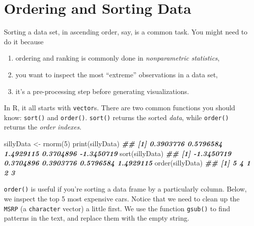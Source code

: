 \documentclass[
  12pt,
  krantz2]{krantz}
\makeatletter
\newenvironment{Shaded}{\begin{snugshade}}{\end{snugshade}}
\newcommand{\DecValTok}[1]{\textcolor[rgb]{0.06,0.06,0.06}{#1}}
\newcommand{\DocumentationTok}[1]{\textcolor[rgb]{0.37,0.37,0.37}{\textbf{\textit{#1}}}}
\newcommand{\FunctionTok}[1]{\textcolor[rgb]{0,0,0}{#1}}
\newcommand{\NormalTok}[1]{#1}
\newcommand{\OtherTok}[1]{\textcolor[rgb]{0.37,0.37,0.37}{#1}}
\providecommand{\tightlist}{%
  \setlength{\itemsep}{0pt}\setlength{\parskip}{0pt}}
\newenvironment{kframe}{%
\medskip{}
\setlength{\fboxsep}{.8em}
 \def\at@end@of@kframe{}%
 \ifinner\ifhmode%
  \def\at@end@of@kframe{\end{minipage}}%
  \begin{minipage}{\columnwidth}%
 \fi\fi%
 \def\FrameCommand##1{\hskip\@totalleftmargin \hskip-\fboxsep
 \colorbox{shadecolor}{##1}\hskip-\fboxsep
     \hskip-\linewidth \hskip-\@totalleftmargin \hskip\columnwidth}%
 \MakeFramed {\advance\hsize-\width
   \@totalleftmargin\z@ \linewidth\hsize
   \@setminipage}}%
 {\par\unskip\endMakeFramed%
 \at@end@of@kframe}
\renewenvironment{Shaded}{\begin{kframe}}{\end{kframe}}
\makeatother
\begin{document}
\hypertarget{ordering-and-sorting-data}{%
\section{Ordering and Sorting Data}\label{ordering-and-sorting-data}}

Sorting a data set, in ascending order, say, is a common task. You might need to do it because

\begin{enumerate}
\def\labelenumi{\arabic{enumi}.}
\tightlist
\item
  ordering and ranking is commonly done in \emph{nonparametric statistics},
\item
  you want to inspect the most ``extreme'' observations in a data set,
\item
  it's a pre-processing step before generating visualizations.
\end{enumerate}

In R, it all starts with \texttt{vector}s. There are two common functions you should know: \texttt{sort()} and \texttt{order()}. \texttt{sort()} returns the sorted \emph{data}, while \texttt{order()} returns the \emph{order indexes}.

\begin{Shaded}
\begin{Highlighting}[]
\NormalTok{sillyData }\OtherTok{\textless{}{-}} \FunctionTok{rnorm}\NormalTok{(}\DecValTok{5}\NormalTok{)}
\FunctionTok{print}\NormalTok{(sillyData)}
\DocumentationTok{\#\# [1]  0.3903776  0.5796584  1.4929115  0.3704896 {-}1.3450719}
\FunctionTok{sort}\NormalTok{(sillyData)}
\DocumentationTok{\#\# [1] {-}1.3450719  0.3704896  0.3903776  0.5796584  1.4929115}
\FunctionTok{order}\NormalTok{(sillyData)}
\DocumentationTok{\#\# [1] 5 4 1 2 3}
\end{Highlighting}
\end{Shaded}

\texttt{order()} is useful if you're sorting a data frame by a particularly column. Below, we inspect the top 5 most expensive cars. Notice that we need to clean up the \texttt{MSRP} (a \texttt{character} vector) a little first. We use the function \texttt{gsub()} to find patterns in the text, and replace them with the empty string.
\end{document}
